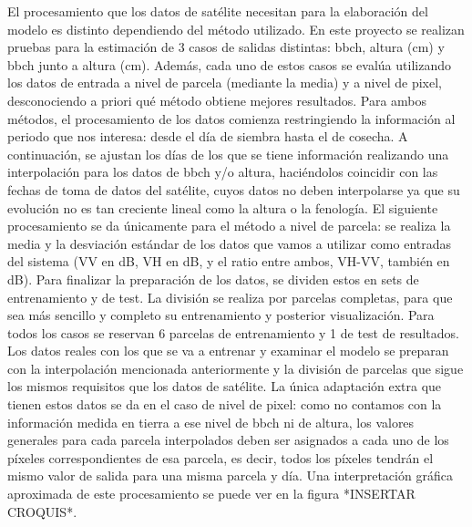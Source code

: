 \par  El procesamiento que los datos de satélite necesitan para la elaboración del modelo es distinto dependiendo del método utilizado. En este proyecto se realizan pruebas para la estimación de 3 casos de salidas distintas: \gls{bbch}, altura (cm) y \gls{bbch} junto a altura (cm). Además, cada uno de estos casos se evalúa utilizando los datos de entrada a nivel de parcela (mediante la media) y a nivel de pixel, desconociendo a priori qué método obtiene mejores resultados. Para ambos métodos, el procesamiento de los datos comienza restringiendo la información al periodo que nos interesa: desde el día de siembra hasta el de cosecha. A continuación, se ajustan los días de los que se tiene información realizando una interpolación para los datos de \gls{bbch} y/o altura, haciéndolos coincidir con las fechas de toma de datos del satélite, cuyos datos no deben interpolarse ya que su evolución no es tan creciente lineal como la altura o la fenología. El siguiente procesamiento se da únicamente para el método a nivel de parcela: se realiza la media y la desviación estándar de los datos que vamos a utilizar como entradas del sistema (VV en dB, VH en dB, y el ratio entre ambos, VH-VV, también en dB). Para finalizar la preparación de los datos, se dividen estos en sets de entrenamiento y de test. La división se realiza por parcelas completas, para que sea más sencillo y completo su entrenamiento y posterior visualización. Para todos los casos se reservan 6 parcelas de entrenamiento y 1 de test de resultados. Los datos reales con los que se va a entrenar y examinar el modelo se preparan con la interpolación mencionada anteriormente y la división de parcelas que sigue los mismos requisitos que los datos de satélite. La única adaptación extra que tienen estos datos se da en el caso de nivel de pixel: como no contamos con la información medida en tierra a ese nivel de \gls{bbch} ni de altura, los valores generales para cada parcela interpolados deben ser asignados a cada uno de los píxeles correspondientes de esa parcela, es decir, todos los píxeles tendrán el mismo valor de salida para una misma parcela y día. Una interpretación gráfica aproximada de este procesamiento se puede ver en la figura *INSERTAR CROQUIS*.
\\
